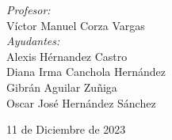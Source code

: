 \begin{titlepage}
    \begin{minipage}{0.7\textwidth}
        \begin{flushleft} \large
            \emph{Profesor:}\\
                Víctor Manuel Corza Vargas\\
                \vspace{3mm}
                \emph{Ayudantes:}\\
                Alexis Hérnandez Castro\\
                \vspace{2mm}
                Diana Irma Canchola Hernández\\
                \vspace{2mm}
                Gibrán Aguilar Zuñiga\\
                \vspace{2mm}
                Oscar José Hernández Sánchez
        \end{flushleft}
    \end{minipage}
    \vspace{10mm}    
   
    {\large 11 de Diciembre de 2023}\\[2cm]
    \vfill 
    \end{titlepage}